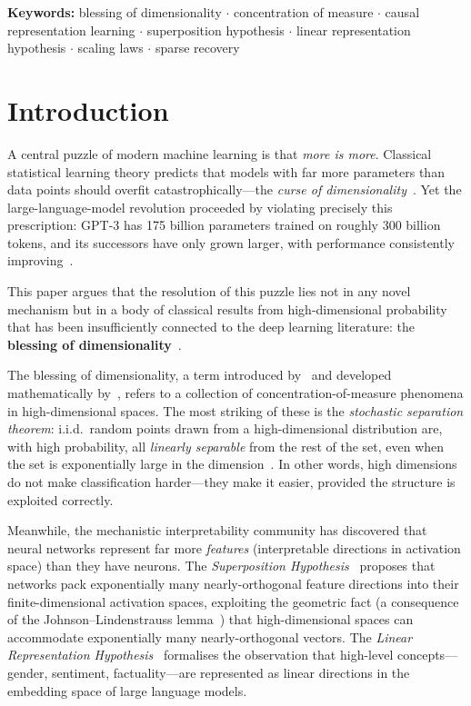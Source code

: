 \documentclass[11pt,a4paper]{article}
\theoremstyle{plain}
\theoremstyle{definition}
\theoremstyle{remark}
\begin{document}
\vspace{1em}
\noindent\textbf{Keywords:}
blessing of dimensionality $\cdot$
concentration of measure $\cdot$
causal representation learning $\cdot$
superposition hypothesis $\cdot$
linear representation hypothesis $\cdot$
scaling laws $\cdot$
sparse recovery

\section{Introduction}\label{sec:intro}

A central puzzle of modern machine learning is that \emph{more is more}.
Classical statistical learning theory predicts that models with far more
parameters than data points should overfit catastrophically---the
\emph{curse of dimensionality}~\citep{bellman1961adaptive}.  Yet the
large-language-model revolution proceeded by violating precisely this
prescription: GPT-3 has 175 billion parameters trained on roughly 300 billion
tokens, and its successors have only grown larger, with performance consistently
improving~\citep{kaplan2020scaling, hoffmann2022training}.

This paper argues that the resolution of this puzzle lies not in any novel
mechanism but in a body of classical results from high-dimensional probability
that has been insufficiently connected to the deep learning literature: the
\textbf{blessing of dimensionality}~\citep{donoho2000high, gorban2018blessing}.

The blessing of dimensionality, a term introduced by~\citet{donoho2000high} and
developed mathematically by~\citet{gorban2018blessing}, refers to a collection of
concentration-of-measure phenomena in high-dimensional spaces.  The most striking
of these is the \emph{stochastic separation theorem}: i.i.d.\ random points
drawn from a high-dimensional distribution are, with high probability, all
\emph{linearly separable} from the rest of the set, even when the set is
exponentially large in the dimension~\citep{gorban2018blessing,
gorban2020blessing}.  In other words, high dimensions do not make classification
harder---they make it easier, provided the structure is exploited correctly.

Meanwhile, the mechanistic interpretability community has discovered that neural
networks represent far more \emph{features} (interpretable directions in
activation space) than they have neurons.  The \emph{Superposition
Hypothesis}~\citep{elhage2022superposition} proposes that networks pack
exponentially many nearly-orthogonal feature directions into their
finite-dimensional activation spaces, exploiting the geometric fact (a
consequence of the Johnson--Lindenstrauss lemma~\citep{johnson1984extensions})
that high-dimensional spaces can accommodate exponentially many
nearly-orthogonal vectors.  The \emph{Linear Representation
Hypothesis}~\citep{park2024linear} formalises the observation that high-level
concepts---gender, sentiment, factuality---are represented as linear directions
in the embedding space of large language models.
\end{document}
